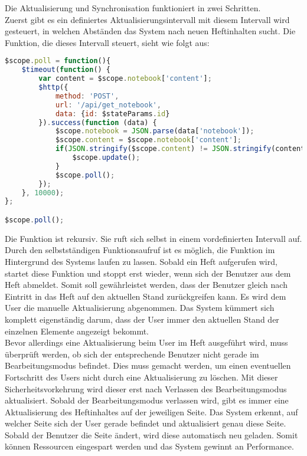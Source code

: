 \newpage

Die Aktualisierung und Synchronisation funktioniert in zwei Schritten.\\
Zuerst gibt es ein definiertes Aktualisierungsintervall mit diesem Intervall wird gesteuert, in welchen Abständen das System nach neuen Heftinhalten sucht. Die Funktion, die dieses Intervall steuert, sieht wie folgt aus:
\begin{lstlisting}[caption={Aktualisierung - PWS}, language=Javascript]
$scope.poll = function(){
    $timeout(function() {
        var content = $scope.notebook['content'];
        $http({
            method: 'POST',
            url: '/api/get_notebook',
            data: {id: $stateParams.id}
        }).success(function (data) {
            $scope.notebook = JSON.parse(data['notebook']);
            $scope.content = $scope.notebook['content'];
            if(JSON.stringify($scope.content) != JSON.stringify(content)) {
                $scope.update();
            }
            $scope.poll();
        });
    }, 10000);
};

$scope.poll();
\end{lstlisting}

Die Funktion ist rekursiv. Sie ruft sich selbst in einem vordefinierten Intervall auf. Durch den selbstständigen Funktionsaufruf ist es möglich, die Funktion im Hintergrund des Systems laufen zu lassen. Sobald ein Heft aufgerufen wird, startet diese Funktion und stoppt erst wieder, wenn sich der Benutzer aus dem Heft abmeldet. Somit soll gewährleistet werden, dass der Benutzer gleich nach Eintritt in das Heft auf den aktuellen Stand zurückgreifen kann. Es wird dem User die manuelle Aktualisierung abgenommen. Das System kümmert sich komplett eigenständig darum, dass der User immer den aktuellen Stand der einzelnen Elemente angezeigt bekommt. \\
Bevor allerdings eine Aktualisierung beim User im Heft ausgeführt wird, muss überprüft werden, ob sich der entsprechende Benutzer nicht gerade im Bearbeitungsmodus befindet. Dies muss gemacht werden, um einen eventuellen Fortschritt des Users nicht durch eine Aktualisierung zu löschen. Mit dieser Sicherheitsvorkehrung wird dieser erst nach Verlassen des Bearbeitungsmodus aktualisiert. Sobald der Bearbeitungsmodus verlassen wird, gibt es immer eine Aktualisierung des Heftinhaltes auf der jeweiligen Seite. Das System erkennt, auf welcher Seite sich der User gerade befindet und aktualisiert genau diese Seite. Sobald der Benutzer die Seite ändert, wird diese automatisch neu geladen. Somit können Ressourcen eingespart werden und das System gewinnt an Performance.

